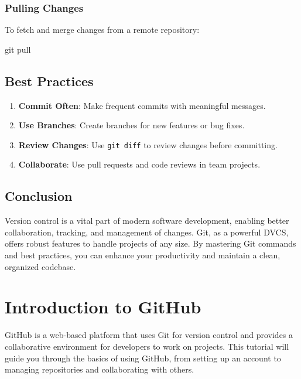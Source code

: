\documentclass[
  letterpaper,
  DIV=11,
  numbers=noendperiod]{scrreprt}
\newenvironment{Shaded}{\begin{snugshade}}{\end{snugshade}}
\newcommand{\FunctionTok}[1]{\textcolor[rgb]{0.28,0.35,0.67}{#1}}
\newcommand{\NormalTok}[1]{\textcolor[rgb]{0.00,0.23,0.31}{#1}}
\providecommand{\tightlist}{%
  \setlength{\itemsep}{0pt}\setlength{\parskip}{0pt}}\usepackage{longtable,booktabs,array}
\begin{document}
\subsubsection{Pulling Changes}\label{pulling-changes}

To fetch and merge changes from a remote repository:

\begin{Shaded}
\begin{Highlighting}[]
\FunctionTok{git}\NormalTok{ pull}
\end{Highlighting}
\end{Shaded}

\subsection{Best Practices}\label{best-practices-12}

\begin{enumerate}
\def\labelenumi{\arabic{enumi}.}
\tightlist
\item
  \textbf{Commit Often}: Make frequent commits with meaningful messages.
\item
  \textbf{Use Branches}: Create branches for new features or bug fixes.
\item
  \textbf{Review Changes}: Use \texttt{git\ diff} to review changes
  before committing.
\item
  \textbf{Collaborate}: Use pull requests and code reviews in team
  projects.
\end{enumerate}

\subsection{Conclusion}\label{conclusion-55}

Version control is a vital part of modern software development, enabling
better collaboration, tracking, and management of changes. Git, as a
powerful DVCS, offers robust features to handle projects of any size. By
mastering Git commands and best practices, you can enhance your
productivity and maintain a clean, organized codebase.

\section{Introduction to GitHub}\label{introduction-to-github}

GitHub is a web-based platform that uses Git for version control and
provides a collaborative environment for developers to work on projects.
This tutorial will guide you through the basics of using GitHub, from
setting up an account to managing repositories and collaborating with
others.
\end{document}
